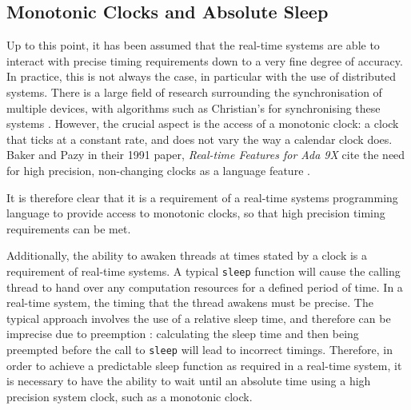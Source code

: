 \subsection{Monotonic Clocks and Absolute Sleep}
Up to this point, it has been assumed that the real-time systems are able to 
interact with precise timing requirements down to a very fine degree of accuracy.
In practice, this is not always the case, in particular with the use of 
distributed systems. There is a large field of research surrounding the 
synchronisation of multiple devices, with algorithms such as Christian's for 
synchronising these systems \cite{37958}. However, the crucial aspect is the 
access of a monotonic clock: a clock that ticks at a constant rate, and does not 
vary the way a calendar clock does. Baker and Pazy in their 1991 paper, \emph{
Real-time Features for Ada 9X} cite the need for high precision, non-changing 
clocks as a language feature \cite{160371}. 
\par\bigskip\noindent
It is therefore clear that it is a requirement of a real-time systems programming 
language to provide access to monotonic clocks, so that high precision timing 
requirements can be met. 
\par\bigskip\noindent
Additionally, the ability to awaken threads at times stated by a clock is a 
requirement of real-time systems. A typical \texttt{sleep} function will cause 
the calling thread to hand over any computation resources for a defined period of time. 
In a real-time system, the timing that the thread awakens must be precise. 
The typical approach involves the use of a relative sleep time, and therefore can 
be imprecise due to preemption \cite{real-time-systems}: calculating the sleep time
and then being preempted before the call to \texttt{sleep} will lead to incorrect 
timings. Therefore, in order to achieve a predictable 
sleep function as required in a real-time system, it is necessary 
to have the ability to wait until an absolute time using a high precision 
system clock, such as a monotonic clock.

